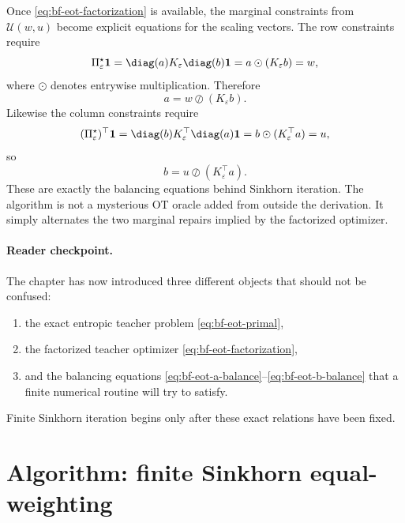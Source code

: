 Once \eqref{eq:bf-eot-factorization} is available, the marginal constraints from
\(\mathcal U(w,u)\) become explicit equations for the scaling vectors.  The row
constraints require
\begin{equation}
\label{eq:bf-eot-row-balance-derived}
  \Pi_\varepsilon^\star\mathbf 1
  =
  \diag(a)K_\varepsilon\diag(b)\mathbf 1
  =
  a \odot (K_\varepsilon b)
  = w,
\end{equation}
where \(\odot\) denotes entrywise multiplication.  Therefore
\begin{equation}
\label{eq:bf-eot-a-balance}
  a = w \oslash (K_\varepsilon b).
\end{equation}
Likewise the column constraints require
\begin{equation}
\label{eq:bf-eot-col-balance-derived}
  (\Pi_\varepsilon^\star)^\top\mathbf 1
  =
  \diag(b)K_\varepsilon^\top\diag(a)\mathbf 1
  =
  b \odot (K_\varepsilon^\top a)
  = u,
\end{equation}
so
\begin{equation}
\label{eq:bf-eot-b-balance}
  b = u \oslash (K_\varepsilon^\top a).
\end{equation}
These are exactly the balancing equations behind Sinkhorn iteration.  The algorithm
is not a mysterious OT oracle added from outside the derivation.  It simply
alternates the two marginal repairs implied by the factorized optimizer.

\paragraph{Reader checkpoint.}
The chapter has now introduced three different objects that should not be
confused:
\begin{enumerate}[label=(\roman*)]
  \item the exact entropic teacher problem \eqref{eq:bf-eot-primal},
  \item the factorized teacher optimizer \eqref{eq:bf-eot-factorization},
  \item and the balancing equations \eqref{eq:bf-eot-a-balance}--\eqref{eq:bf-eot-b-balance}
  that a finite numerical routine will try to satisfy.
\end{enumerate}
Finite Sinkhorn iteration begins only after these exact relations have been fixed.

\section{Algorithm: finite Sinkhorn equal-weighting}
\label{sec:bf-eot-algorithm}

